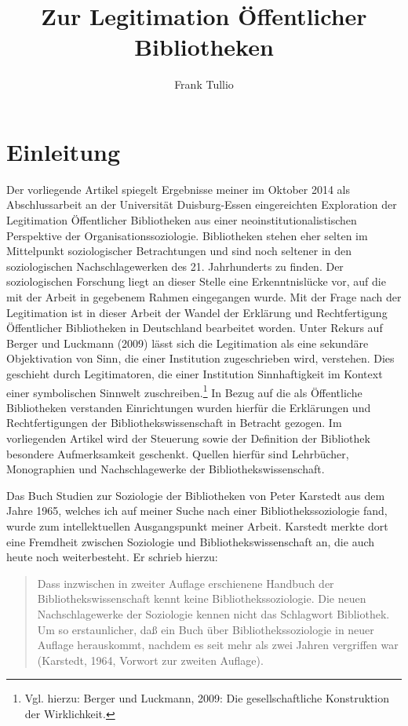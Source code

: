 \documentclass[a4paper,
fontsize=11pt,
oneside,
numbers=noperiodatend,
parskip=half-,
bibliography=totoc,
final
]{scrartcl}
\title{\LARGE{Zur Legitimation Öffentlicher Bibliotheken}} %
\author{Frank Tullio} %
\date{}
\begin{document}
\maketitle
\thispagestyle{fancyplain} 


\section*{Einleitung}\label{einleitung}

Der vorliegende Artikel spiegelt Ergebnisse meiner im Oktober 2014 als
Abschlussarbeit an der Universität Duisburg-Essen eingereichten
Exploration der Legitimation Öffentlicher Bibliotheken aus einer
neoinstitutionalistischen Perspektive der Organisationssoziologie.
Bibliotheken stehen eher selten im Mittelpunkt soziologischer
Betrachtungen und sind noch seltener in den soziologischen
Nachschlagewerken des 21. Jahrhunderts zu finden. Der soziologischen
Forschung liegt an dieser Stelle eine Erkenntnislücke vor, auf die mit
der Arbeit in gegebenem Rahmen eingegangen wurde. Mit der Frage nach der
Legitimation ist in dieser Arbeit der Wandel der Erklärung und
Rechtfertigung Öffentlicher Bibliotheken in Deutschland bearbeitet
worden. Unter Rekurs auf Berger und Luckmann (2009) lässt sich die
Legitimation als eine sekundäre Objektivation von Sinn, die einer
Institution zugeschrieben wird, verstehen. Dies geschieht durch
Legitimatoren, die einer Institution Sinnhaftigkeit im Kontext einer
symbolischen Sinnwelt zuschreiben.\footnote{Vgl. hierzu: Berger und
  Luckmann, 2009: Die gesellschaftliche Konstruktion der Wirklichkeit.}
In Bezug auf die als Öffentliche Bibliotheken verstanden Einrichtungen
wurden hierfür die Erklärungen und Rechtfertigungen der
Bibliothekswissenschaft in Betracht gezogen. Im vorliegenden Artikel
wird der Steuerung sowie der Definition der Bibliothek besondere
Aufmerksamkeit geschenkt. Quellen hierfür sind Lehrbücher, Monographien
und Nachschlagewerke der Bibliothekswissenschaft.

Das Buch Studien zur Soziologie der Bibliotheken von Peter Karstedt aus
dem Jahre 1965, welches ich auf meiner Suche nach einer
Bibliothekssoziologie fand, wurde zum intellektuellen Ausgangspunkt
meiner Arbeit. Karstedt merkte dort eine Fremdheit zwischen Soziologie
und Bibliothekswissenschaft an, die auch heute noch weiterbesteht. Er
schrieb hierzu:

\begin{quote}
Dass inzwischen in zweiter Auflage erschienene Handbuch der
Bibliothekswissenschaft kennt keine Bibliothekssoziologie. Die neuen
Nachschlagewerke der Soziologie kennen nicht das Schlagwort Bibliothek.
Um so erstaunlicher, daß ein Buch über Bibliothekssoziologie in neuer
Auflage herauskommt, nachdem es seit mehr als zwei Jahren vergriffen war
(Karstedt, 1964, Vorwort zur zweiten Auflage).
\end{quote}
\end{document}
